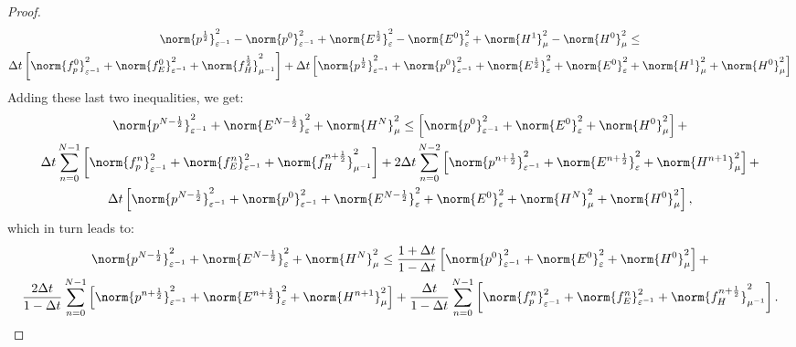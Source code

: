 \documentclass{amsart}
\theoremstyle{thmstyleone}%
\theoremstyle{thmstyletwo}%
\theoremstyle{thmstylethree}%
\begin{document}
\begin{proof}
\begin{multline*}
  \norm{p^{\frac{1}{2}}}^2_{\varepsilon^{-1}}  - \norm{p^0}^2_{\varepsilon^{-1}} + \norm{E^{\frac{1}{2}}}^2_{\varepsilon} - \norm{E^0}^2_{\varepsilon} + \norm{H^{1}}^2_{\mu} - \norm{H^0}^2_{\mu}  \le \\
  \Delta t \left[ \norm{f_p^0}^2_{\varepsilon^{-1}} + \norm{f_E^0}^2_{\varepsilon^{-1}} + \norm{f_H^{\frac{1}{2}}}^2_{\mu^{-1}} \right] + \Delta t \left[ \norm{p^{\frac{1}{2}}}^2_{\varepsilon^{-1}} + \norm{p^0}^2_{\varepsilon^{-1}}  + \norm{E^{\frac{1}{2}}}^2_{\varepsilon} + \norm{E^0}^2_{\varepsilon}  + \norm{H^{1}}^2_{\mu}  + \norm{H^0}^2_{\mu} \right] 
\end{multline*}
Adding these last two inequalities, we get:
\begin{multline*}
  \norm{p^{N - \frac{1}{2}}}^2_{\varepsilon^{-1}} + \norm{E^{N - \frac{1}{2}}}^2_{\varepsilon} + \norm{H^N}^2_{\mu} \le \left[ \norm{p^0}^2_{\varepsilon^{-1}} + \norm{E^0}^2_{\varepsilon} + \norm{H^0}^2_{\mu} \right] + \\
  \Delta t \sum\limits_{n = 0}^{N - 1} \left[ \norm{f_p^n}^2_{\varepsilon^{-1}} + \norm{f_E^n}^2_{\varepsilon^{-1}} + \norm{f_H^{n + \frac{1}{2}}}^2_{\mu^{-1}} \right] + 2 \Delta t \sum\limits_{n = 0}^{N - 2} \left[ \norm{p^{n + \frac{1}{2}}}^2_{\varepsilon^{-1}} +\norm{E^{n + \frac{1}{2}}}^2_{\varepsilon} +  \norm{H^{n + 1}}^2_{\mu} \right] + \\
  \Delta t \left[\norm{p^{N - \frac{1}{2}}}^2_{\varepsilon^{-1}} + \norm{p^0}^2_{\varepsilon^{-1}} + \norm{E^{N - \frac{1}{2}}}^2_{\varepsilon} +
\norm{E^0}^2_{\varepsilon}  + \norm{H^N}^2_{\mu} + \norm{H^0}^2_{\mu} \right],
\end{multline*}
which in turn leads to:
\begin{multline*}
  \norm{p^{N - \frac{1}{2}}}^2_{\varepsilon^{-1}} + \norm{E^{N - \frac{1}{2}}}^2_{\varepsilon} + \norm{H^N}^2_{\mu} \le \dfrac{1 + \Delta t}{1 - \Delta t} \left[ \norm{p^0}^2_{\varepsilon^{-1}} + \norm{E^0}^2_{\varepsilon} + \norm{H^0}^2_{\mu} \right] + \\
  \dfrac{2 \Delta t}{1 - \Delta t} \sum\limits_{n = 0}^{N - 1} \left[ \norm{p^{n + \frac{1}{2}}}^2_{\varepsilon^{-1}} +\norm{E^{n + \frac{1}{2}}}^2_{\varepsilon} +  \norm{H^{n + 1}}^2_{\mu} \right] + \dfrac{ \Delta t}{1 - \Delta t} \sum\limits_{n = 0}^{N - 1} \left[ \norm{f_p^n}^2_{\varepsilon^{-1}} + \norm{f_E^n}^2_{\varepsilon^{-1}} + \norm{f_H^{n + \frac{1}{2}}}^2_{\mu^{-1}} \right].
\end{multline*}

\end{proof}
\end{document}
